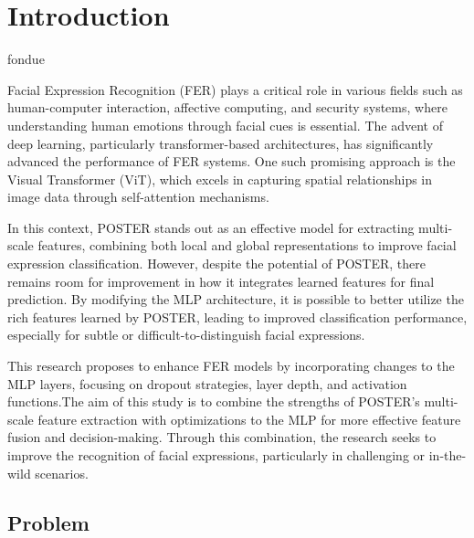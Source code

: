\chapter{Introduction}
\label{chapter:introduction}
%
%

\Gls{fondue}

Facial Expression Recognition (FER) plays a critical role in various fields such as human-computer interaction, affective computing, and security systems, where understanding human emotions through facial cues is essential. The advent of deep learning, particularly transformer-based architectures, has significantly advanced the performance of FER systems. One such promising approach is the Visual Transformer (ViT), which excels in capturing spatial relationships in image data through self-attention mechanisms.

In this context, POSTER \cite{zheng_poster_2022} stands out as an effective model for extracting multi-scale features, combining both local and global representations to improve facial expression classification. However, despite the potential of POSTER, there remains room for improvement in how it integrates learned features for final prediction. By modifying the MLP architecture, it is possible to better utilize the rich features learned by POSTER, leading to improved classification performance, especially for subtle or difficult-to-distinguish facial expressions. 


This research proposes to enhance FER models by incorporating changes to the MLP layers, focusing on dropout strategies, layer depth, and activation functions.The aim of this study is to combine the strengths of POSTER’s multi-scale feature extraction with optimizations to the MLP for more effective feature fusion and decision-making. Through this combination, the research seeks to improve the recognition of facial expressions, particularly in challenging or in-the-wild scenarios. 

\newpage

\section{Problem}


%

